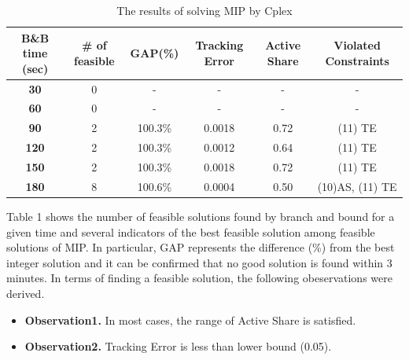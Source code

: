 \documentclass[11pt]{article}
\begin{document}
\begin{itemize}
\begin{table}[h]
	\centering
	\footnotesize 
	\caption{The results of solving MIP by Cplex}
	\label{tab1}
	\begin{tabular}{cccccc}
\\
		\hline
		\hline
		\textbf{B\&B time (sec)} & \textbf{\# of feasible} & \textbf{GAP(\%)} & \textbf{Tracking Error} & \textbf{Active Share} & \textbf{Violated Constraints} \\ [2mm]\hline
		\textbf{30} & 0 & - & - & - & -  \\[2mm]
		\textbf{60} & 0 & - & - & - & -  \\[2mm]
		\textbf{90} & 2 & 100.3\% & {\color[HTML]{CB0000} 0.0018} & 0.72 & (11) TE \\[2mm]
		\textbf{120} & 2 & 100.3\% & {\color[HTML]{CB0000} 0.0012} & 0.64 & (11) TE \\[2mm]
		\textbf{150} & 2 & 100.3\% & {\color[HTML]{CB0000} 0.0018} & 0.72 & (11) TE \\[2mm]
		\textbf{180} & 8 & 100.6\% & {\color[HTML]{CB0000} 0.0004} & {\color[HTML]{CB0000} 0.50} & (10)AS, (11) TE  \\ \hline
	\end{tabular}
\end{table}
	Table 1 shows the number of feasible solutions found by branch and bound for a given time and several indicators of the best feasible solution among feasible solutions of MIP. In particular, GAP represents the difference (\%) from the best integer solution and it can be confirmed that no good solution is found within 3 minutes. In terms of finding a feasible solution, the following obeservations were derived.
	\begin{itemize}
		\item[] \textbf{Observation1.} In most cases, the range of Active Share is satisfied.
		\item[] \textbf{Observation2.} Tracking Error is less than lower bound (0.05).
	\end{itemize}
	

\end{itemize}
\end{document}

